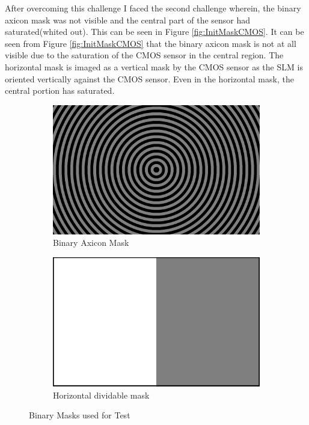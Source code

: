 After overcoming this challenge I faced the second challenge wherein, the binary axicon mask was not visible and the central part of the sensor had saturated(whited out). This can be seen in Figure \ref{fig:InitMaskCMOS}. It can be seen from Figure \ref{fig:InitMaskCMOS} that the binary axicon mask is not at all visible due to the saturation of the CMOS sensor in the central region. The horizontal mask is imaged as a vertical mask by the CMOS sensor as the SLM is oriented vertically against the CMOS sensor. Even in the horizontal mask, the central portion has saturated. 

\begin{figure}[h]
    \centering
    \begin{subfigure}{0.5\textwidth}
    \centering
        \includegraphics[width=0.5\linewidth]{pics/slm/binaryaxicon.png}
        \caption{Binary Axicon Mask}
        \label{fig:axiconmask}
    \end{subfigure}%
    \begin{subfigure}{0.5\textwidth}
    \centering
        \includegraphics[width=0.5\linewidth]{pics/slm/hor-div.png}
        \caption{Horizontal dividable mask}
        \label{fig:hordivmask}
    \end{subfigure}
    \caption{Binary Masks used for Test}
    \label{fig:InitMask}
    \end{figure}
    
